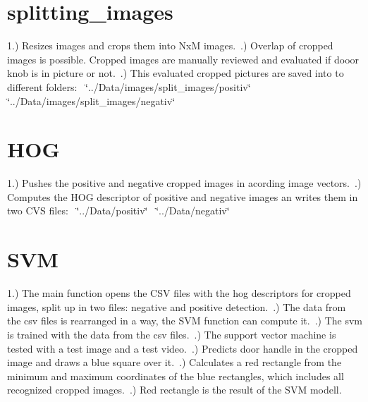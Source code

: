 \hypertarget{index_splitting_images}{}\section{splitting\+\_\+images}\label{index_splitting_images}
1.) Resizes images and crops them into NxM images.~.) Overlap of cropped images is possible. Cropped images are manually reviewed and evaluated if dooor knob is in picture or not.~.) This evaluated cropped pictures are saved into to different folders\+:~\newline
 \char`\"{}../\+Data/images/split\+\_\+images/positiv\char`\"{}~\newline
 \char`\"{}../\+Data/images/split\+\_\+images/negativ\char`\"{} \hypertarget{index_HOG}{}\section{H\+OG}\label{index_HOG}
1.) Pushes the positive and negative cropped images in acording image vectors.~.) Computes the H\+OG descriptor of positive and negative images an writes them in two C\+VS files\+:~\newline
 \char`\"{}../\+Data/positiv\char`\"{}~\newline
 \char`\"{}../\+Data/negativ\char`\"{}\hypertarget{index_SVM}{}\section{S\+VM}\label{index_SVM}
1.) The main function opens the C\+SV files with the hog descriptors for cropped images, split up in two files\+: negative and positive detection.~.) The data from the csv files is rearranged in a way, the S\+VM function can compute it.~.) The svm is trained with the data from the csv files.~.) The support vector machine is tested with a test image and a test video.~.) Predicts door handle in the cropped image and draws a blue square over it.~.) Calculates a red rectangle from the minimum and maximum coordinates of the blue rectangles, which includes all recognized cropped images.~.) Red rectangle is the result of the S\+VM modell. 